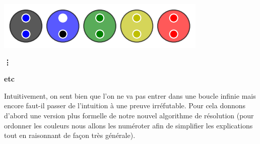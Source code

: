 \begin{multicols}{2}
\begin{center}
        \includegraphics[scale= 0.45]{content/algo_bubble/example/014.png}

        \textbf{\vdots}

        \textbf{etc}
    \end{center}
\end{multicols}


Intuitivement, on sent bien que l'on ne va pas entrer dans une boucle infinie mais encore faut-il passer de l'intuition à une preuve irréfutable. Pour cela donnons d'abord une version plus formelle de notre nouvel algorithme de résolution (pour ordonner les couleurs nous allons les numéroter afin de simplifier les explications tout en raisonnant de façon très générale).

\bigskip

